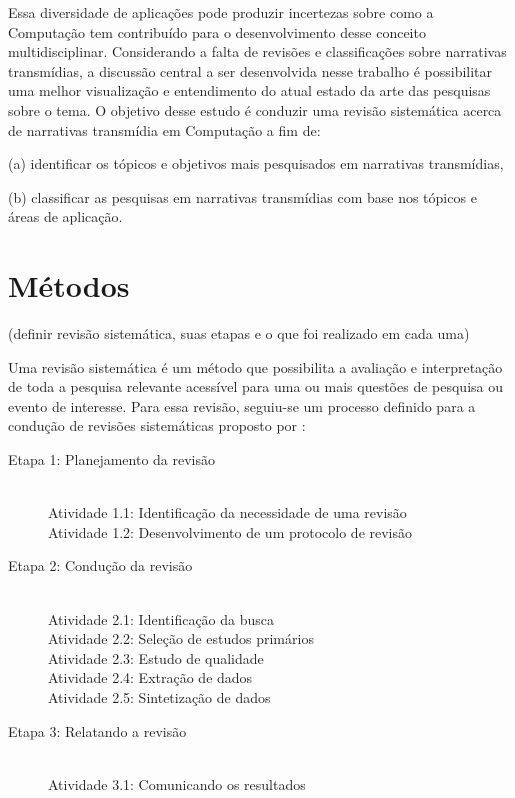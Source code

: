 \documentclass[
article,			%
11pt,				%
oneside,			%
a4paper,			%
english,			%
brazil,				%
sumario=tradicional
]{abntex2}
\begin{document}
  Essa diversidade de aplicações pode produzir incertezas sobre como a Computação tem contribuído para o desenvolvimento desse conceito multidisciplinar. Considerando a falta de revisões e classificações sobre narrativas transmídias, a discussão central a ser desenvolvida nesse trabalho é possibilitar uma melhor visualização e entendimento do atual estado da arte das pesquisas sobre o tema.  O objetivo desse estudo é conduzir uma revisão sistemática acerca de narrativas transmídia em Computação a fim de:

  (a) identificar os tópicos e objetivos mais pesquisados em narrativas transmídias,

  (b) classificar as pesquisas em narrativas transmídias com base nos tópicos e áreas de aplicação.

  \section{Métodos}

  \textsf{(definir revisão sistemática, suas etapas e o que foi realizado em cada uma)}

  Uma revisão sistemática é um método que possibilita a avaliação e interpretação de toda a pesquisa relevante acessível para uma ou mais questões de pesquisa ou evento de interesse. Para essa revisão, seguiu-se um processo definido para a condução de revisões sistemáticas proposto por :

  \begin{description}
    \item[Etapa 1: Planejamento da revisão] \hfill \\
    Atividade 1.1: Identificação da necessidade de uma revisão \\
    Atividade 1.2: Desenvolvimento de um protocolo de revisão
    \item[Etapa 2: Condução da revisão] \hfill \\
    Atividade 2.1: Identificação da busca \\
    Atividade 2.2: Seleção de estudos primários \\
    Atividade 2.3: Estudo de qualidade \\
    Atividade 2.4: Extração de dados \\
    Atividade 2.5: Sintetização de dados
    \item[Etapa 3: Relatando a revisão] \hfill \\
    Atividade 3.1: Comunicando os resultados
  \end{description}
\end{document}
